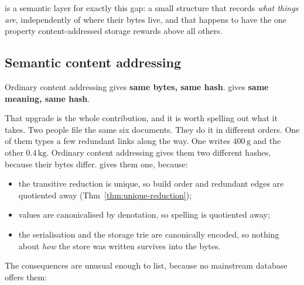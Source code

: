 \odag{} is a semantic layer for exactly this gap: a small structure that
records \emph{what things are}, independently of where their bytes live, and
that happens to have the one property content-addressed storage rewards above
all others.

\subsection{Semantic content addressing}

\begin{keyidea}
Ordinary content addressing gives \textbf{same bytes, same hash}. \odag{}
gives \textbf{same meaning, same hash}.
\end{keyidea}

That upgrade is the whole contribution, and it is worth spelling out what it
takes. Two people file the same six documents. They do it in different orders.
One of them types a few redundant links along the way. One writes
$400\,\mathrm{g}$ and the other $0.4\,\mathrm{kg}$. Ordinary content
addressing gives them two different hashes, because their bytes differ.
\odag{} gives them one, because:

\begin{itemize}[leftmargin=1.4em]
\item the transitive reduction is unique, so build order and redundant edges
  are quotiented away (Thm~\ref{thm:unique-reduction});
\item values are canonicalised by denotation, so spelling is quotiented away;
\item the serialisation and the storage trie are canonically encoded, so
  nothing about \emph{how} the store was written survives into the bytes.
\end{itemize}

The consequences are unusual enough to list, because no mainstream database
offers them:

